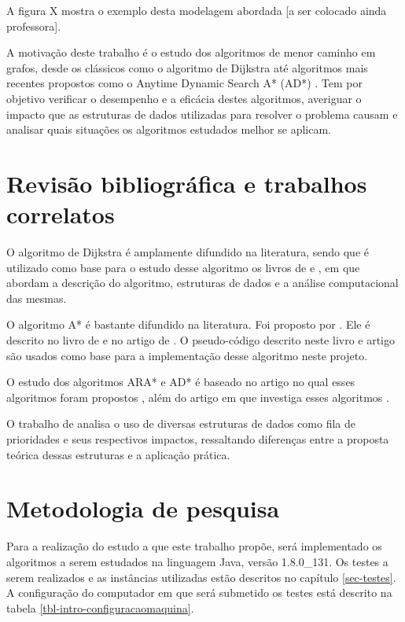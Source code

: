 A figura X mostra o exemplo desta modelagem abordada [a ser colocado ainda professora].

A motivação deste trabalho é o estudo dos algoritmos de menor caminho em grafos, desde os clássicos como o algoritmo de Dijkstra \cite{dijkstra1959note} até algoritmos mais recentes propostos como o Anytime Dynamic Search A* (AD*) \cite{likhachev2008anytime}. Tem por  objetivo verificar o desempenho e a eficácia destes algoritmos, averiguar o impacto que as estruturas de dados utilizadas para resolver o problema causam e analisar quais situações os algoritmos estudados melhor se aplicam.

\section{Revisão bibliográfica e trabalhos correlatos}
\label{sec-intro-correlatos}
O algoritmo de Dijkstra é amplamente difundido na literatura, sendo que é utilizado como base para o estudo desse algoritmo os livros de  e , em que abordam a descrição do algoritmo, estruturas de dados e a análise computacional das mesmas.

O algoritmo A* é bastante difundido na literatura. Foi proposto por . Ele é descrito no livro de  e no artigo de . O pseudo-código descrito neste livro e artigo são usados como base para a implementação desse algoritmo neste projeto.

O estudo dos algoritmos ARA* e AD* é baseado no artigo no qual esses algoritmos foram propostos \cite{likhachev2008anytime}, além do artigo em que investiga esses algoritmos \cite{moura2010estudo}.

O trabalho de  analisa o uso de diversas estruturas de dados como fila de prioridades e seus respectivos impactos, ressaltando diferenças entre a proposta teórica dessas estruturas e a aplicação prática.
\section{Metodologia de pesquisa}
\label{sec-intro-metodologia}
Para a realização do estudo a que este trabalho propõe, será implementado os algoritmos a serem estudados na linguagem Java, versão 1.8.0\_131. Os testes a serem realizados e as instâncias utilizadas estão descritos no capítulo \ref{sec-testes}. A configuração do computador em que será submetido os testes está descrito na tabela \ref{tbl-intro-configuracaomaquina}.

